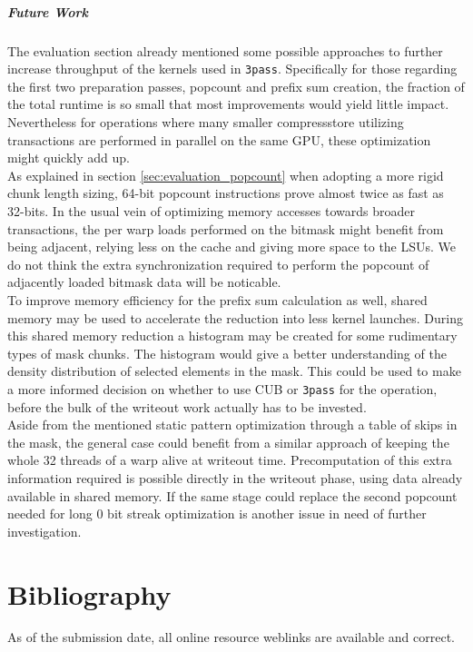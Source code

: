 \documentclass{tudscrreprt}
\begin{document}
		\paragraph{Future Work} The evaluation section already mentioned some possible approaches to further increase throughput of the kernels used in \texttt{3pass}. Specifically for those regarding the first two preparation passes, popcount and prefix sum creation, the fraction of the total runtime is so small that most improvements would yield little impact. Nevertheless for operations where many smaller compressstore utilizing transactions are performed in parallel on the same GPU, these optimization might quickly add up. \\
		As explained in section \ref{sec:evaluation_popcount} when adopting a more rigid chunk length sizing, 64-bit popcount instructions prove almost twice as fast as 32-bits. In the usual vein of optimizing memory accesses towards broader transactions, the per warp loads performed on the bitmask might benefit from being adjacent, relying less on the cache and giving more space to the LSUs. We do not think the extra synchronization required to perform the popcount of adjacently loaded bitmask data will be noticable. \\
		To improve memory efficiency for the prefix sum calculation as well, shared memory may be used to accelerate the reduction into less kernel launches. During this shared memory reduction a histogram may be created for some rudimentary types of mask chunks. The histogram would give a better understanding of the density distribution of selected elements in the mask. This could be used to make a more informed decision on whether to use CUB or \texttt{3pass} for the operation, before the bulk of the writeout work actually has to be invested. \\
		Aside from the mentioned static pattern optimization through a table of skips in the mask, the general case could benefit from a similar approach of keeping the whole 32 threads of a warp alive at writeout time. Precomputation of this extra information required is possible directly in the writeout phase, using data already available in shared memory. If the same stage could replace the second popcount needed for long 0 bit streak optimization is another issue in need of further investigation. \\
		
	\chapter*{Bibliography}
		As of the submission date, all online resource weblinks are available and correct.
		\printbibliography[heading=none]
	
\end{document}
